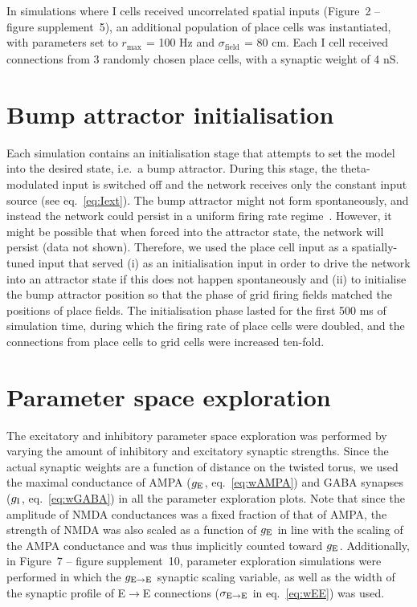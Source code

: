 \documentclass[a4paper,12pt]{article}
\newcommand{\ssc}[3]{\ensuremath{#1_{\text{#2}_{\text{#3}}}}}
\newcommand{\gE      }{\ssc{g}      {\scriptsize{E}}{}}
\newcommand{\gI      }{\ssc{g}      {\scriptsize{I}}{}}
\newcommand{\gEE     }{\ssc{g}      {\scriptsize{E}\ensuremath{\rightarrow}\scriptsize{E}}{}}
\newcommand{\sigmaEE }{\ssc{\sigma} {\scriptsize{E}\ensuremath{\rightarrow}\scriptsize{E}}{}}
\begin{document}
In simulations where I cells received uncorrelated spatial inputs (Figure~2 --
figure supplement~5), an additional population of place cells was
instantiated, with parameters set to \ssc{r}{max}{} = 100 Hz and
\ssc{\sigma}{field}{} = 80 cm.  Each I cell received connections from 3
randomly chosen place cells, with a synaptic weight of 4 nS.



\section{Bump attractor initialisation} \label{sec:noise_bump_init_app}

Each simulation contains an initialisation stage that attempts to set the model
into the desired state, i.e.\ a bump attractor. During this stage, the
theta-modulated input is switched off and the network receives only the
constant input source (see eq.~\ref{eq:Iext}). The bump attractor might not
form spontaneously, and instead the network could persist in a  uniform firing
rate regime~\citep{Compte:2000ul}. However, it might be possible that when
forced into the attractor state, the network will persist (data not shown).
Therefore, we used the place cell input as a spatially-tuned input that served
(i) as an initialisation input in order to drive the network into an attractor
state if this does not happen spontaneously and (ii) to initialise the bump
attractor position so that the phase of grid firing fields matched the positions
of place fields. The initialisation phase lasted for the first 500 ms of
simulation time, during which the firing rate of place cells were doubled, and
the connections from place cells to grid cells were increased ten-fold.



\section{Parameter space exploration} \label{sec:param_sweeps}

The excitatory and inhibitory parameter space exploration was performed by
varying the amount of inhibitory and excitatory synaptic strengths. Since the
actual synaptic weights are a function of distance on the twisted torus, we
used the maximal conductance of AMPA ($\gE$, eq.~\ref{eq:wAMPA}) and GABA
synapses ($\gI$, eq.~\ref{eq:wGABA}) in all the parameter exploration plots.
Note that since the amplitude of NMDA conductances was a fixed fraction of that
of AMPA, the strength of NMDA was also scaled as a function of $\gE$ in line
with the scaling of the AMPA conductance and was thus implicitly counted toward
$\gE$. Additionally, in Figure~7 -- figure supplement~10, parameter exploration
simulations were performed in which the $\gEE$ synaptic scaling variable, as
well as the width of the synaptic profile of E$\rightarrow$E connections
($\sigmaEE$ in eq.~\ref{eq:wEE}) was used.
\end{document}
